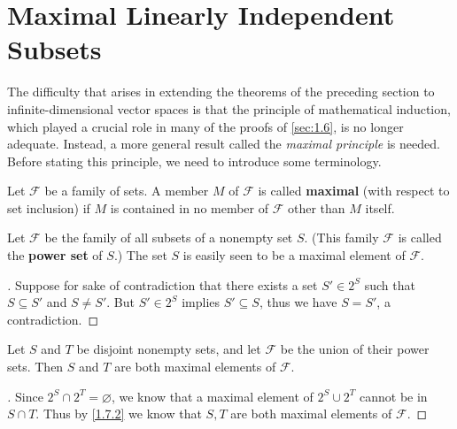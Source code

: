 \section{Maximal Linearly Independent Subsets}\label{sec:1.7}

\begin{note}
  The difficulty that arises in extending the theorems of the preceding section to infinite-dimensional vector spaces is that the principle of mathematical induction, which played a crucial role in many of the proofs of \cref{sec:1.6}, is no longer adequate.
  Instead, a more general result called the \emph{maximal principle} is needed.
  Before stating this principle, we need to introduce some terminology.
\end{note}

\begin{defn}\label{1.7.1}
  Let \(\mathcal{F}\) be a family of sets.
  A member \(M\) of \(\mathcal{F}\) is called \textbf{maximal} (with respect to set inclusion) if \(M\) is contained in no member of \(\mathcal{F}\) other than \(M\) itself.
\end{defn}

\begin{eg}\label{1.7.2}
  Let \(\mathcal{F}\) be the family of all subsets of a nonempty set \(S\).
  (This family \(\mathcal{F}\) is called the \textbf{power set} of \(S\).)
  The set \(S\) is easily seen to be a maximal element of \(\mathcal{F}\).
\end{eg}

\begin{proof}[]
  Suppose for sake of contradiction that there exists a set \(S' \in 2^S\) such that \(S \subseteq S'\) and \(S \neq S'\).
  But \(S' \in 2^S\) implies \(S' \subseteq S\), thus we have \(S = S'\), a contradiction.
\end{proof}

\begin{eg}\label{1.7.3}
  Let \(S\) and \(T\) be disjoint nonempty sets, and let \(\mathcal{F}\) be the union of their power sets.
  Then \(S\) and \(T\) are both maximal elements of \(\mathcal{F}\).
\end{eg}

\begin{proof}[]
  Since \(2^S \cap 2^T = \varnothing\), we know that a maximal element of \(2^S \cup 2^T\) cannot be in \(S \cap T\).
  Thus by \cref{1.7.2} we know that \(S, T\) are both maximal elements of \(\mathcal{F}\).
\end{proof}

